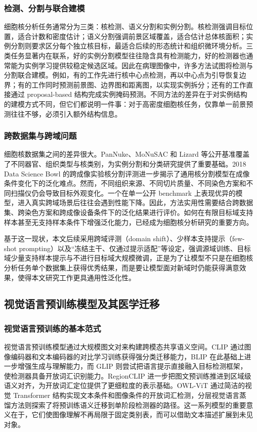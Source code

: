 \subsubsection{检测、分割与联合建模}
细胞核分析任务通常分为三类：核检测、语义分割和实例分割。核检测强调目标位置，适合计数和密度估计；语义分割强调前景区域覆盖，适合估计总体核面积；实例分割则要求区分每个独立核目标，最适合后续的形态统计和组织微环境分析。三类任务显著内在联系，好的实例分割模型往往隐含具有检测能力，好的检测器也通常能为实例学习提供较稳定候选区域。因此在病理图像中，许多方法试图将检测与分割联合建模。例如，有的工作先进行核中心点检测，再以中心点为引导恢复边界；有的工作同时预测前景图、边界图和距离图，以实现实例拆分；还有的工作直接通过 proposal-based 结构完成实例掩码预测。不同方法的差异在于对实例结构的建模方式不同，但它们都说明一件事：对于高密度细胞核任务，仅靠单一前景预测往往不够，必须引入额外结构信息。

\subsubsection{跨数据集与跨域问题}
细胞核数据集之间的差异很大。PanNuke、MoNuSAC 和 Lizard 等公开基准覆盖了不同器官、组织类型与核类别，为实例分割和分类研究提供了重要基础\cite{gamper2019pannuke,verma2021monusac,graham2021lizard}。2018 Data Science Bowl 的跨成像实验核分割评测进一步揭示了通用核分割模型在成像条件变化下的泛化难点\cite{caicedo2019datasciencebowl}。然而，不同组织来源、不同切片质量、不同染色方案和不同扫描仪仍会导致目标外观变化。一个在单一公开 benchmark 上表现优异的模型，进入真实跨域场景后往往会遇到性能下降。因此，方法实用性需要结合跨数据集、跨染色方案和跨成像设备条件下的泛化结果进行评价。如何在有限目标域支持样本甚至无支持样本条件下增强泛化能力，已经成为细胞核分析研究的重要方向。

基于这一现状，本文后续采用跨域评测（domain shift）、少样本支持提示（few-shot prompting）以及“冻结主干、仅通过提示适配”等设定，强调源域训练、目标域少量支持样本提示与不进行目标域大规模微调，正是为了让模型不只是在细胞核分析任务单个数据集上获得优秀结果，而是要让模型面对新域时仍能获得满意效果，使得本文研究工作更具通用性泛化性。

\subsection{视觉语言预训练模型及其医学迁移}
\subsubsection{视觉语言预训练的基本范式}
视觉语言预训练模型通过大规模图文对来构建跨模态共享语义空间。CLIP 通过图像编码器和文本编码器的对比学习训练获得强分类迁移能力，BLIP 在此基础上进一步增强生成与理解能力，而 GLIP 则尝试把语言提示直接融入目标检测框架，使检测器具备开放词汇识别能力\cite{radford2021learning,li2022glip}。RegionCLIP 进一步把图文预训练推进到区域级语义对齐，为开放词汇定位提供了更细粒度的表示基础\cite{zhong2022regionclip}。OWL-ViT 通过简洁的视觉 Transformer 结构实现文本条件和图像条件的开放词汇检测，分层视觉语言蒸馏方法则探索了将预训练语义迁移到单阶段检测器的路径\cite{minderer2022owlvit,ma2022hierkd}。这一系列模型的重要意义在于，它们使图像理解不再局限于固定类别表，而可以借助文本描述扩展到未见对象。

